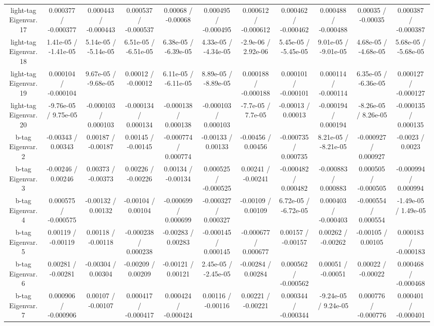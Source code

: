 \begin{table}[htbp]
\begin{center}
\begin{tabular}{|c|c|c|c|c|c|c|c|c|c|c|}
  light-tag Eigenvar. 17 & 0.000377 / -0.000377 & 0.000443 / -0.000443 & 0.000537 / -0.000537 & 0.00068 / -0.00068 & 0.000495 / -0.000495 & 0.000612 / -0.000612 & 0.000462 / -0.000462 & 0.000488 / -0.000488 & 0.00035 / -0.00035 & 0.000387 / -0.000387 \\ 
  light-tag Eigenvar. 18 & 1.41e-05 / -1.41e-05 & 5.14e-05 / -5.14e-05 & 6.51e-05 / -6.51e-05 & 6.38e-05 / -6.39e-05 & 4.33e-05 / -4.34e-05 & -2.9e-06 / 2.92e-06 & 5.45e-05 / -5.45e-05 & 9.01e-05 / -9.01e-05 & 4.68e-05 / -4.68e-05 & 5.68e-05 / -5.68e-05 \\ 
  light-tag Eigenvar. 19 & 0.000104 / -0.000104 & 9.67e-05 / -9.68e-05 & 0.00012 / -0.00012 & 6.11e-05 / -6.11e-05 & 8.89e-05 / -8.89e-05 & 0.000188 / -0.000188 & 0.000101 / -0.000101 & 0.000114 / -0.000114 & 6.35e-05 / -6.36e-05 & 0.000127 / -0.000127 \\ 
  light-tag Eigenvar. 20 & -9.76e-05 / 9.75e-05 & -0.000103 / 0.000103 & -0.000134 / 0.000134 & -0.000138 / 0.000138 & -0.000103 / 0.000103 & -7.7e-05 / 7.7e-05 & -0.00013 / 0.00013 & -0.000194 / 0.000194 & -8.26e-05 / 8.26e-05 & -0.000135 / 0.000135 \\ 
  b-tag Eigenvar. 2 & -0.00343 / 0.00343 & 0.00187 / -0.00187 & 0.00145 / -0.00145 & -0.000774 / 0.000774 & -0.00133 / 0.00133 & -0.00456 / 0.00456 & -0.000735 / 0.000735 & 8.21e-05 / -8.21e-05 & -0.000927 / 0.000927 & -0.0023 / 0.0023 \\ 
  b-tag Eigenvar. 3 & -0.00246 / 0.00246 & 0.00373 / -0.00373 & 0.00226 / -0.00226 & 0.00134 / -0.00134 & 0.000525 / -0.000525 & 0.00241 / -0.00241 & -0.000482 / 0.000482 & -0.000883 / 0.000883 & 0.000505 / -0.000505 & -0.000994 / 0.000994 \\ 
  b-tag Eigenvar. 4 & 0.000575 / -0.000575 & -0.00132 / 0.00132 & -0.00104 / 0.00104 & -0.000699 / 0.000699 & -0.000327 / 0.000327 & -0.00109 / 0.00109 & 6.72e-05 / -6.72e-05 & 0.000403 / -0.000403 & -0.000554 / 0.000554 & -1.49e-05 / 1.49e-05 \\ 
  b-tag Eigenvar. 5 & 0.00119 / -0.00119 & 0.00118 / -0.00118 & -0.000238 / 0.000238 & -0.00283 / 0.00283 & -0.000145 / 0.000145 & -0.000677 / 0.000677 & 0.00157 / -0.00157 & 0.00262 / -0.00262 & -0.00105 / 0.00105 & 0.000183 / -0.000183 \\ 
  b-tag Eigenvar. 6 & 0.00281 / -0.00281 & -0.00304 / 0.00304 & -0.00209 / 0.00209 & -0.00121 / 0.00121 & 2.45e-05 / -2.45e-05 & -0.00284 / 0.00284 & 0.000562 / -0.000562 & 0.00051 / -0.00051 & 0.00022 / -0.00022 & 0.000468 / -0.000468 \\ 
  b-tag Eigenvar. 7 & 0.000906 / -0.000906 & 0.00107 / -0.00107 & 0.000417 / -0.000417 & 0.000424 / -0.000424 & 0.00116 / -0.00116 & 0.00221 / -0.00221 & 0.000344 / -0.000344 & -9.24e-05 / 9.24e-05 & 0.000776 / -0.000776 & 0.000401 / -0.000401 \\ 

\end{tabular}
\end{center}
\end{table}
